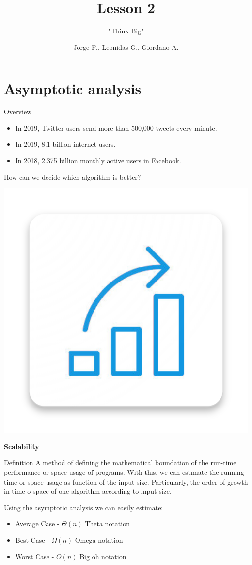 \documentclass{beamer}
\author{Jorge F., Leonidas G., Giordano A.}
\title{Lesson 2}
\subtitle{"Think Big"}
\institute{UTEC}
\date{}
\begin{document}
\begin{frame}
  \titlepage
\end{frame}


\section{Asymptotic analysis}

\begin{frame}{Overview}

  \begin{itemize}
    \item In 2019, Twitter users send more than 500,000 tweets every minute.
    \item In 2019, 8.1 billion internet users.
    \item In 2018, 2.375 billion monthly active users in Facebook.
  \end{itemize}

  How can we decide which algorithm is better?

  \begin{center}
    \includegraphics[width=0.23\linewidth]{../img/scalability}

    \textbf{Scalability}
  \end{center}

\end{frame}


\begin{frame}{Definition}
  A method of defining the mathematical boundation of the run-time performance or space usage of programs. With this, we can estimate the running time or space usage as function of the input size. Particularly, the order of growth in time o space of one algorithm according to input size.

  Using the asymptotic analysis we can easily estimate:
  \begin{itemize}
    \item Average Case - $\Theta(n)$ Theta notation
    \item Best Case - $\Omega(n)$ Omega notation
    \item Worst Case - $O(n)$ Big oh notation
  \end{itemize}
\end{frame}
\end{document}
